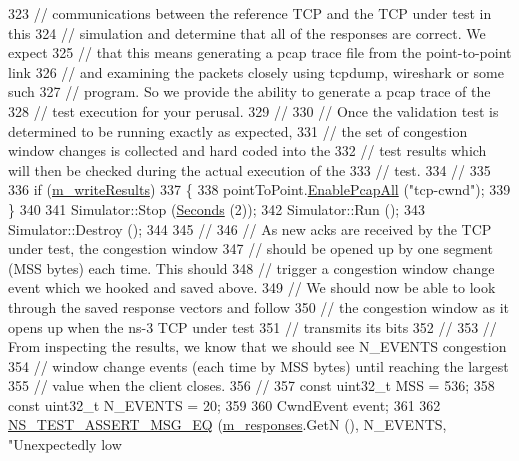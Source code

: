 \begin{DoxyCode}
323   \textcolor{comment}{// communications between the reference TCP and the TCP under test in this}
324   \textcolor{comment}{// simulation and determine that all of the responses are correct.  We expect}
325   \textcolor{comment}{// that this means generating a pcap trace file from the point-to-point link}
326   \textcolor{comment}{// and examining the packets closely using tcpdump, wireshark or some such}
327   \textcolor{comment}{// program.  So we provide the ability to generate a pcap trace of the }
328   \textcolor{comment}{// test execution for your perusal.}
329   \textcolor{comment}{//}
330   \textcolor{comment}{// Once the validation test is determined to be running exactly as expected,}
331   \textcolor{comment}{// the set of congestion window changes is collected and hard coded into the }
332   \textcolor{comment}{// test results which will then be checked during the actual execution of the}
333   \textcolor{comment}{// test.}
334   \textcolor{comment}{//}
335 
336   \textcolor{keywordflow}{if} (\hyperlink{classNs3TcpCwndTestCase1_a190399add30bd33923dcd99ef55ec603}{m\_writeResults})
337     \{
338       pointToPoint.\hyperlink{classns3_1_1PcapHelperForDevice_a4ab183a2512120200d4a0e5d8ececd49}{EnablePcapAll} (\textcolor{stringliteral}{"tcp-cwnd"});
339     \}
340 
341   Simulator::Stop (\hyperlink{group__timecivil_ga33c34b816f8ff6628e33d5c8e9713b9e}{Seconds} (2));
342   Simulator::Run ();
343   Simulator::Destroy ();
344 
345   \textcolor{comment}{//}
346   \textcolor{comment}{// As new acks are received by the TCP under test, the congestion window }
347   \textcolor{comment}{// should be opened up by one segment (MSS bytes) each time.  This should}
348   \textcolor{comment}{// trigger a congestion window change event which we hooked and saved above.}
349   \textcolor{comment}{// We should now be able to look through the saved response vectors and follow}
350   \textcolor{comment}{// the congestion window as it opens up when the ns-3 TCP under test }
351   \textcolor{comment}{// transmits its bits}
352   \textcolor{comment}{//}
353   \textcolor{comment}{// From inspecting the results, we know that we should see N\_EVENTS congestion}
354   \textcolor{comment}{// window change events (each time by MSS bytes) until reaching the largest}
355   \textcolor{comment}{// value when the client closes.}
356   \textcolor{comment}{//}
357   \textcolor{keyword}{const} uint32\_t MSS = 536;
358   \textcolor{keyword}{const} uint32\_t N\_EVENTS = 20;
359 
360   CwndEvent event;
361 
362   \hyperlink{group__testing_ga2a9d78cffb3db8e867c35fff0b698cf5}{NS\_TEST\_ASSERT\_MSG\_EQ} (\hyperlink{classNs3TcpCwndTestCase1_af29c36f15173cf8f986304e2a593f021}{m\_responses}.GetN (), N\_EVENTS, \textcolor{stringliteral}{"Unexpectedly low
}
\end{DoxyCode}
